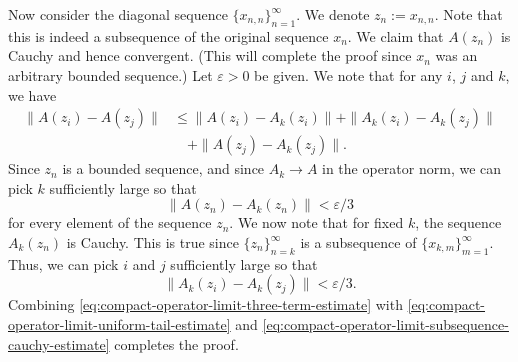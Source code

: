 \begin{Proof}
Now consider the diagonal sequence $\{x_{n,n}\}_{n=1}^\infty$. We denote $z_n:=x_{n,n}$. Note that this is indeed a subsequence of the original sequence $x_n$. We claim that $A(z_n)$ is Cauchy and hence convergent. (This will complete the proof since $x_n$ was an arbitrary bounded sequence.) Let $\varepsilon>0$ be given. We note that for any $i$, $j$ and $k$, we have
\begin{equation}\label{eq:compact-operator-limit-three-term-estimate}
\begin{aligned}
\|A(z_i)-A(z_j)\|&\leq\|A(z_i)-A_k(z_i)\|+\|A_k(z_i)-A_k(z_j)\|\\
&\quad+\|A(z_j)-A_k(z_j)\|.
\end{aligned}
\end{equation}
Since $z_n$ is a bounded sequence, and since $A_k\to A$ in the operator norm, we can pick $k$ sufficiently large so that
\begin{equation}\label{eq:compact-operator-limit-uniform-tail-estimate}
\|A(z_n)-A_k(z_n)\|<\varepsilon/3
\end{equation}
for every element of the sequence $z_n$. We now note that for fixed $k$, the sequence $A_k(z_n)$ is Cauchy. This is true since $\{z_n\}_{n=k}^\infty$ is a subsequence of $\{x_{k,m}\}_{m=1}^\infty$. Thus, we can pick $i$ and $j$ sufficiently large so that
\begin{equation}\label{eq:compact-operator-limit-subsequence-cauchy-estimate}
\|A_k(z_i)-A_k(z_j)\|<\varepsilon/3.
\end{equation}
Combining \eqref{eq:compact-operator-limit-three-term-estimate} with \eqref{eq:compact-operator-limit-uniform-tail-estimate} and \eqref{eq:compact-operator-limit-subsequence-cauchy-estimate} completes the proof.
\end{Proof}
\endgroup
